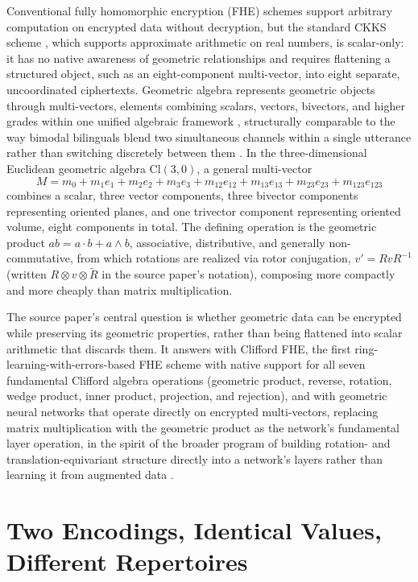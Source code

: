 Conventional fully homomorphic encryption (FHE) schemes support arbitrary computation on encrypted data without decryption, but the standard CKKS scheme \cite{cheon2017}, which supports approximate arithmetic on real numbers, is scalar-only: it has no native awareness of geometric relationships and requires flattening a structured object, such as an eight-component multi-vector, into eight separate, uncoordinated ciphertexts. Geometric algebra represents geometric objects through multi-vectors, elements combining scalars, vectors, bivectors, and higher grades within one unified algebraic framework \cite{dorst2007}, structurally comparable to the way bimodal bilinguals blend two simultaneous channels within a single utterance rather than switching discretely between them \cite{herbertpires2017}. In the three-dimensional Euclidean geometric algebra $\mathrm{Cl}(3,0)$, a general multi-vector
\[
M = m_0 + m_1 e_1 + m_2 e_2 + m_3 e_3 + m_{12}e_{12} + m_{13}e_{13} + m_{23}e_{23} + m_{123}e_{123}
\]
combines a scalar, three vector components, three bivector components representing oriented planes, and one trivector component representing oriented volume, eight components in total. The defining operation is the geometric product $ab = a\cdot b + a\wedge b$, associative, distributive, and generally non-commutative, from which rotations are realized via rotor conjugation, $v' = RvR^{-1}$ (written $R \otimes v \otimes \tilde R$ in the source paper's notation), composing more compactly and more cheaply than matrix multiplication.

The source paper's central question is whether geometric data can be encrypted while preserving its geometric properties, rather than being flattened into scalar arithmetic that discards them. It answers with Clifford FHE, the first ring-learning-with-errors-based FHE scheme with native support for all seven fundamental Clifford algebra operations (geometric product, reverse, rotation, wedge product, inner product, projection, and rejection), and with geometric neural networks that operate directly on encrypted multi-vectors, replacing matrix multiplication with the geometric product as the network's fundamental layer operation, in the spirit of the broader program of building rotation- and translation-equivariant structure directly into a network's layers rather than learning it from augmented data \cite{bronstein2021,thomas2018,charles2017}.

\section{Two Encodings, Identical Values, Different Repertoires}

